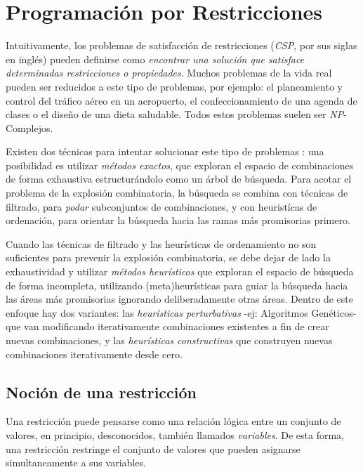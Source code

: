 \documentclass{llncs}
\begin{document}
  \section{\textbf{Programación por Restricciones}}
    \label{sec:fundprog}
    Intuitivamente, los problemas de satisfacción de restricciones (\textit{CSP}, por sus siglas en inglés) pueden definirse como \textit{encontrar una solución que satisface determinadas restricciones o pro\-pie\-da\-des}. Muchos problemas de la vida real pueden ser reducidos a 
    este tipo de problemas, por ejemplo: el planeamiento y control del tráfico aéreo en un aeropuerto, el confeccionamiento de una agenda de clases o el diseño de una dieta saludable. 
    Todos estos problemas suelen ser \textit{NP}-Complejos.
    
   Existen dos técnicas para intentar solucionar este tipo de problemas \cite{sol}: una posibilidad es utilizar \textit{métodos exactos}, que exploran el espacio de combinaciones de forma exhaustiva estructurándolo como un árbol de búsqueda. Para acotar el problema de la
    explosión combinatoria, la búsqueda se combina con técnicas de filtrado, para
    \textit{podar} subconjuntos de combinaciones, y con heuristícas de ordenación, para orientar la búsqueda hacia las ramas más promisorias primero.
    
    Cuando las técnicas de filtrado y las heurísticas de ordenamiento no son suficientes para prevenir la explosión combinatoria, se debe dejar de lado la exhaustividad y utilizar \textit{métodos heurísticos} que exploran el espacio de búsqueda de forma incompleta, utilizando (meta)heurísticas para guiar la búsqueda hacia las áreas más promisorias ignorando deliberadamente otras áreas. Dentro de este enfoque hay dos variantes: las \textit{heurísticas perturbativas} -ej: Algoritmos Genéticos- que van modificando iterativamente combinaciones existentes a fin de crear nuevas combinaciones, y las \textit{heurísticas constructivas} que construyen nuevas combinaciones iterativamente desde cero.
    
    \subsection{Noción de una restricción}
      Una restricción puede pensarse como una relación lógica entre un conjunto de valores, en principio,
      desconocidos, también llamados \textit{variables}. De esta forma, una restricción restringe el conjunto
      de valores que pueden asignarse simultaneamente a sus variables.
      
\end{document}
